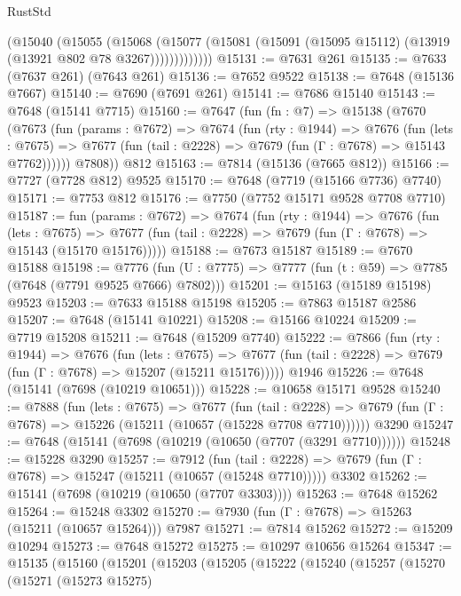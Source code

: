 \begin{lexlean}{RustStd}
\begin{coremodule}
              (@15040
                (@15055
                  (@15068
                    (@15077
                      (@15081 (@15091 (@15095 @15112) (@13919 (@13921 @802 @78 @3267)))))))))))))
@15131 := @7631 @261
@15135 := @7633 (@7637 @261) (@7643 @261)
@15136 := @7652 @9522
@15138 := @7648 (@15136 @7667)
@15140 := @7690 (@7691 @261)
@15141 := @7686 @15140
@15143 := @7648 (@15141 @7715)
@15160 := @7647
    (fun (fn : @7) =>
    @15138
      (@7670
        (@7673
          (fun (params : @7672) =>
          @7674
            (fun (rty : @1944) =>
            @7676
              (fun (lets : @7675) =>
              @7677 (fun (tail : @2228) => @7679 (fun (Γ : @7678) => @15143 @7762))))))
        @7808))
    @812
@15163 := @7814 (@15136 (@7665 @812))
@15166 := @7727 (@7728 @812) @9525
@15170 := @7648 (@7719 (@15166 @7736) @7740)
@15171 := @7753 @812
@15176 := @7750 (@7752 @15171 @9528 @7708 @7710)
@15187 := fun (params : @7672) =>
  @7674
    (fun (rty : @1944) =>
    @7676
      (fun (lets : @7675) =>
      @7677 (fun (tail : @2228) => @7679 (fun (Γ : @7678) => @15143 (@15170 @15176)))))
@15188 := @7673 @15187
@15189 := @7670 @15188
@15198 := @7776
    (fun (U : @7775) => @7777 (fun (t : @59) => @7785 (@7648 (@7791 @9525 @7666) @7802)))
@15201 := @15163 (@15189 @15198) @9523
@15203 := @7633 @15188 @15198
@15205 := @7863 @15187 @2586
@15207 := @7648 (@15141 @10221)
@15208 := @15166 @10224
@15209 := @7719 @15208
@15211 := @7648 (@15209 @7740)
@15222 := @7866
    (fun (rty : @1944) =>
    @7676
      (fun (lets : @7675) =>
      @7677 (fun (tail : @2228) => @7679 (fun (Γ : @7678) => @15207 (@15211 @15176)))))
    @1946
@15226 := @7648 (@15141 (@7698 (@10219 @10651)))
@15228 := @10658 @15171 @9528
@15240 := @7888
    (fun (lets : @7675) =>
    @7677
      (fun (tail : @2228) =>
      @7679 (fun (Γ : @7678) => @15226 (@15211 (@10657 (@15228 @7708 @7710))))))
    @3290
@15247 := @7648 (@15141 (@7698 (@10219 (@10650 (@7707 (@3291 @7710))))))
@15248 := @15228 @3290
@15257 := @7912
    (fun (tail : @2228) => @7679 (fun (Γ : @7678) => @15247 (@15211 (@10657 (@15248 @7710)))))
    @3302
@15262 := @15141 (@7698 (@10219 (@10650 (@7707 @3303))))
@15263 := @7648 @15262
@15264 := @15248 @3302
@15270 := @7930 (fun (Γ : @7678) => @15263 (@15211 (@10657 @15264))) @7987
@15271 := @7814 @15262
@15272 := @15209 @10294
@15273 := @7648 @15272
@15275 := @10297 @10656 @15264
@15347 := @15135
    (@15160
      (@15201
        (@15203
          (@15205
            (@15222
              (@15240
                (@15257
                  (@15270
                    (@15271
                      (@15273 @15275)

\end{coremodule}
\end{lexlean}
